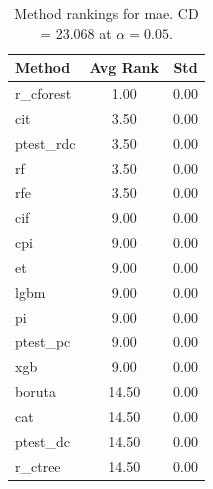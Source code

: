 \begin{table}[h]
\centering
\caption{Method rankings for mae. CD = 23.068 at $\alpha=0.05$.}
\label{tab:ranks_mae}
\begin{tabular}{lcc}
\toprule
Method & Avg Rank & Std \\
\midrule
r_cforest & 1.00 & 0.00 \\
cit & 3.50 & 0.00 \\
ptest_rdc & 3.50 & 0.00 \\
rf & 3.50 & 0.00 \\
rfe & 3.50 & 0.00 \\
cif & 9.00 & 0.00 \\
cpi & 9.00 & 0.00 \\
et & 9.00 & 0.00 \\
lgbm & 9.00 & 0.00 \\
pi & 9.00 & 0.00 \\
ptest_pc & 9.00 & 0.00 \\
xgb & 9.00 & 0.00 \\
boruta & 14.50 & 0.00 \\
cat & 14.50 & 0.00 \\
ptest_dc & 14.50 & 0.00 \\
r_ctree & 14.50 & 0.00 \\
\bottomrule
\end{tabular}
\end{table}